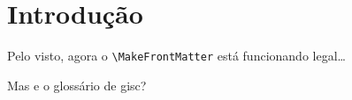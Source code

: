 \documentclass{cleantex}
\begin{document}
\chapter{Introdução}

\providecommand{\CleanTeXprofile}{Não definido via terminal}

Pelo visto, agora o \verb|\MakeFrontMatter| está funcionando legal\dots

Mas e o glossário de \gls{gisc}? 
\end{document}
